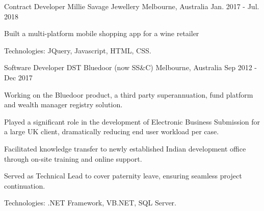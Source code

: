 \begin{cventries}
\cventry
{Contract Developer} %
{Millie Savage Jewellery} %
{Melbourne, Australia} %
{Jan. 2017 - Jul. 2018} %
{
  \begin{cvitems} %
    \item {Built a multi-platform mobile shopping app for a wine retailer}
    \item {Technologies: JQuery, Javascript, HTML, CSS.}
  \end{cvitems}
}

\cventry
{Software Developer} %
{DST Bluedoor (now SS\&C)} %
{Melbourne, Australia} %
{Sep 2012 - Dec 2017} %
{
  \begin{cvitems} %
    \item {Working on the Bluedoor product, a third party superannuation, fund platform and wealth manager registry solution.}
    \item {Played a significant role in the development of Electronic Business Submission for a large UK client, dramatically reducing end user workload per case.}
    \item {Facilitated knowledge transfer to newly established Indian development office through on-site training and online support.}
    \item {Served as Technical Lead to cover paternity leave, ensuring seamless project continuation.}
    \item {Technologies: .NET Framework, VB.NET, SQL Server.}
  \end{cvitems}
}

\end{cventries}
